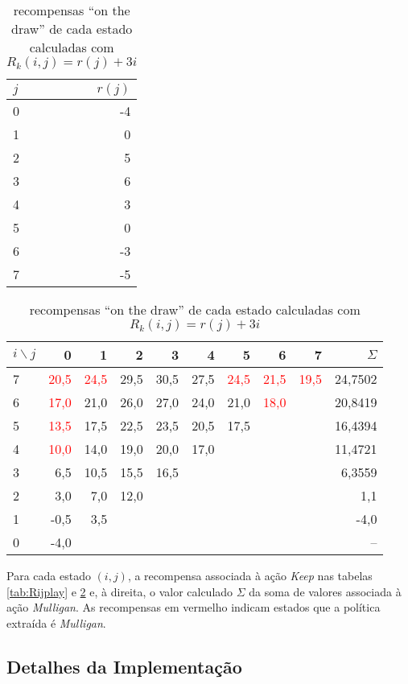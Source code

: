 \begin{table}[!h]
\parbox{.25\linewidth}{
\centering
\vspace{0.2cm}
\begin{tabular}{l|r}
$j$  & $r(j)$ \\ \hline
0 & -4  \\
1 & 0     \\
2 & 5      \\
3 & 6      \\
4 & 3     \\
5 & 0    \\
6 & -3     \\
7 & -5
\end{tabular}
\caption{recompensas-base para $j = 0, \ldots, 7$ }
\label{tab:rjdraw}
}
\hfill
\parbox{.70\linewidth}{
\centering
\begin{tabular}{l|rrrrrrrr|r}
$i \backslash j$ & 0     & 1  & 2  & 3  & 4  & 5  & 6  & 7  & $\Sigma$ \\ \hline
7 & \textcolor{red}{20,5} & \textcolor{red}{24,5} & 29,5 & 30,5 & 27,5 & \textcolor{red}{24,5} & \textcolor{red}{21,5} & \textcolor{red}{19,5} & 24,7502 \\
6 & \textcolor{red}{17,0} & 21,0 & 26,0 & 27,0 & 24,0 & 21,0 & \textcolor{red}{18,0} && 20,8419 \\
5 & \textcolor{red}{13,5} & 17,5 & 22,5 & 23,5 & 20,5 & 17,5 &&& 16,4394 \\
4 & \textcolor{red}{10,0} & 14,0 & 19,0 & 20,0 & 17,0 &&&& 11,4721 \\
3 & 6,5 & 10,5 & 15,5 & 16,5 &&&&& 6,3559 \\
2 & 3,0 & 7,0 & 12,0 &&&&&& 1,1 \\
1 & -0,5 & 3,5 &&&&&&& -4,0 \\
0 & -4,0 &&&&&&&& --
\end{tabular}
\caption{recompensas ``on the draw'' de cada estado calculadas com $R_k(i,j) = r(j) + 3i$}
\label{tab:Rijdraw}
}
\end{table}
Para cada estado $(i, j)$, a recompensa associada à ação \textit{Keep}
nas tabelas \ref{tab:Rijplay} e \ref{tab:Rijdraw} e, à direita, o valor calculado $\Sigma$ da soma de valores
associada à ação \textit{Mulligan}. As recompensas em vermelho indicam estados que a política extraída
é \textit{Mulligan}.

\newpage

\subsection{Detalhes da Implementação}

